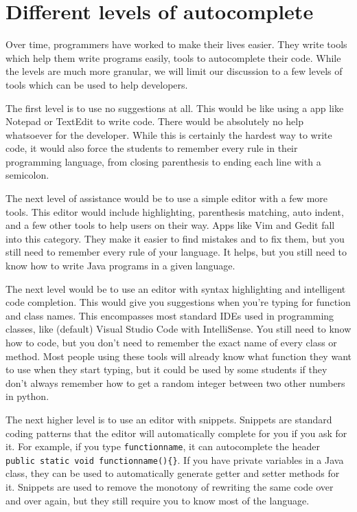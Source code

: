 \documentclass{article}
\begin{document}
\section{Different levels of autocomplete}

Over time, programmers have worked to make their lives easier. They write tools which help them write programs easily, tools to autocomplete their code. While the levels are much more granular, we will limit our discussion to a few levels of tools which can be used to help developers.

The first level is to use no suggestions at all. This would be like using a app like Notepad or TextEdit to write code. There would be absolutely no help whatsoever for the developer. While this is certainly the hardest way to write code, it would also force the students to remember every rule in their programming language, from closing parenthesis to ending each line with a semicolon.

The next level of assistance would be to use a simple editor with a few more tools. This editor would include highlighting, parenthesis matching, auto indent, and a few other tools to help users on their way. Apps like Vim and Gedit fall into this category. They make it easier to find mistakes and to fix them, but you still need to remember every rule of your language. It helps, but you still need to know how to write Java programs in a given language.

The next level would be to use an editor with syntax highlighting and intelligent code completion. This would give you suggestions when you're typing for function and class names. This encompasses most standard IDEs used in programming classes, like (default) Visual Studio Code with IntelliSense. You still need to know how to code, but you don't need to remember the exact name of every class or method. Most people using these tools will already know what function they want to use when they start typing, but it could be used by some students if they don't always remember how to get a random integer between two other numbers in python.

The next higher level is to use an editor with snippets. Snippets are standard coding patterns that the editor will automatically complete for you if you ask for it. For example, if you type \texttt{functionname}, it can autocomplete the header \texttt{public\ static\ void\ functionname()\{\}}. If you have private variables in a Java class, they can be used to automatically generate getter and setter methods for it. Snippets are used to remove the monotony of rewriting the same code over and over again, but they still require you to know most of the language.
\end{document}
